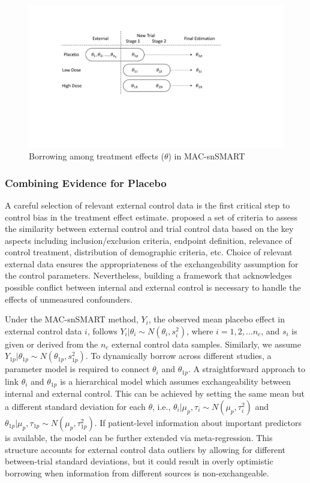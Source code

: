 \begin{figure}
\centering
\includegraphics[width=14cm]{chapters/figures/theta_diagram.pdf}
\caption{Borrowing among treatment effects ($\theta$) in MAC-snSMART}
\label{fig:theta_diagram}
\end{figure}

\subsubsection{Combining Evidence for Placebo}
A careful selection of relevant external control data is the first critical step to control bias in the treatment effect estimate. \cite{pocock1976combination} proposed a set of criteria to assess the similarity between external control and trial control data based on the key aspects including inclusion/exclusion criteria, endpoint definition, relevance of control treatment, distribution of demographic criteria, etc. Choice of relevant external data ensures the appropriateness of the exchangeability assumption for the control parameters. Nevertheless, building a framework that acknowledges possible conflict between internal and external control is necessary to handle the effects of unmeasured confounders. 

Under the \ac{MAC}-snSMART method, $Y_i$, the observed mean placebo effect in external control data $i$, follows $Y_{i}|\theta_{i} \sim N(\theta_{i}, s_{i}^2)$, where $i = 1, 2, ...n_c$, and $s_i$ is given or derived from the $n_c$ external control data samples. Similarly, we assume $Y_{1p}|\theta_{1p} \sim N(\theta_{1p}, s_{1p}^2)$. To dynamically borrow across different studies, a parameter model is required to connect $\theta_i$ and $\theta_{1p}$. A straightforward approach to link $\theta_i$ and $\theta_{1p}$ is a hierarchical model which assumes exchangeability between internal and external control. This can be achieved by setting the same mean but a different standard deviation for each $\theta$, i.e., $\theta_{i} |\mu_p, \tau_i \sim N(\mu_p, \tau_i^2)$ and $\theta_{1p}|\mu_p,\tau_{1p} \sim N(\mu_p, \tau_{1p}^2)$. If patient-level information about important predictors is available, the model can be further extended via meta-regression. This structure accounts for external control data outliers by allowing for different between-trial standard deviations, but it could result in overly optimistic borrowing when information from different sources is non-exchangeable. 

